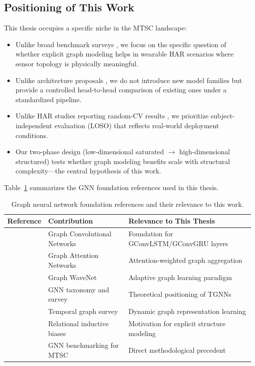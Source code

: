 \documentclass[11pt,a4paper]{article}
\begin{document}
\subsection{Positioning of This Work}

This thesis occupies a specific niche in the MTSC landscape:
\begin{itemize}[leftmargin=*]
  \item Unlike broad benchmark surveys \citep{ruiz2021bakeoff}, we focus on the specific question of whether explicit graph modeling helps in wearable HAR scenarios where sensor topology is physically meaningful.
  \item Unlike architecture proposals \citep{liu2024todynet,zhang2020tapnet}, we do not introduce new model families but provide a controlled head-to-head comparison of existing ones under a standardized pipeline.
  \item Unlike HAR studies reporting random-CV results \citep{wang2024cnnbigru}, we prioritize subject-independent evaluation (LOSO) that reflects real-world deployment conditions.
  \item Our two-phase design (low-dimensional saturated $\to$ high-dimensional structured) tests whether graph modeling benefits scale with structural complexity---the central hypothesis of this work.
\end{itemize}

Table~\ref{tab:lit_gnn} summarizes the GNN foundation references used in this thesis.

\begin{table}[htbp]
\centering
\caption{Graph neural network foundation references and their relevance to this work.}
\label{tab:lit_gnn}
\small
\begin{tabular}{@{}llp{6.5cm}@{}}
\toprule
\textbf{Reference} & \textbf{Contribution} & \textbf{Relevance to This Thesis} \\
\midrule
\citet{kipf2017gcn} & Graph Convolutional Networks & Foundation for GConvLSTM/GConvGRU layers \\
\citet{velickovic2018gat} & Graph Attention Networks & Attention-weighted graph aggregation \\
\citet{wu2019graphwavenet} & Graph WaveNet & Adaptive graph learning paradigm \\
\citet{wu2021gnnsurvey} & GNN taxonomy and survey & Theoretical positioning of TGNNs \\
\citet{kazemi2020tgnnsurvey} & Temporal graph survey & Dynamic graph representation learning \\
\citet{battaglia2018relational} & Relational inductive biases & Motivation for explicit structure modeling \\
\citet{yang2025benchmarkgnn} & GNN benchmarking for MTSC & Direct methodological precedent \\
\bottomrule
\end{tabular}
\end{table}
\end{document}
